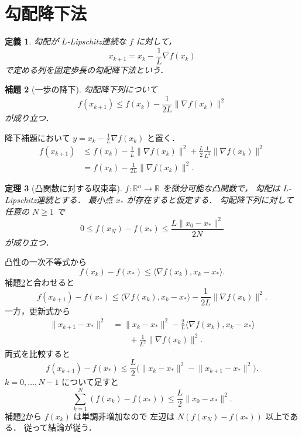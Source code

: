 \documentclass[a5paper,10pt,onecolumn]{jsarticle}
\makeatletter
\theoremstyle{mathnotetheorem}
\newtheorem{theorem}{定理}[section]
\newtheorem{definition}[theorem]{定義}
\newtheorem{lemma}[theorem]{補題}
\renewcommand{\proofname}{証明}
\renewenvironment{proof}[1][\proofname]{%
  \par\pushQED{\qed}\normalfont\topsep4\p@\@plus2\p@\relax
  \trivlist\item[\hskip\labelsep\bfseries #1]\ignorespaces
}{\popQED\endtrivlist\@endpefalse}
\newcommand{\norm}[1]{\lVert #1\rVert}
\makeatother
\begin{document}
\section{勾配降下法}

\begin{definition}
勾配が $L$-Lipschitz連続な $f$ に対して，
\[
 x_{k+1}=x_k-\frac1L\nabla f(x_k)
\]
で定める列を固定歩長の\emph{勾配降下法}という．
\end{definition}

\begin{lemma}[一歩の降下]\label{lem:one-step}
勾配降下列について
\[
 f(x_{k+1})\le f(x_k)
 -\frac1{2L}\norm{\nabla f(x_k)}^2
\]
が成り立つ．
\end{lemma}
\begin{proof}
降下補題において
$y=x_k-\frac1L\nabla f(x_k)$ と置く．
\begin{align*}
 f(x_{k+1})
 &\le f(x_k)
 -\frac1L\norm{\nabla f(x_k)}^2
 +\frac L2\frac1{L^2}\norm{\nabla f(x_k)}^2\\
 &=f(x_k)-\frac1{2L}\norm{\nabla f(x_k)}^2.
\end{align*}
\end{proof}

\begin{theorem}[凸関数に対する収束率]\label{thm:convex-rate}
$f:\mathbb R^n\to\mathbb R$ を微分可能な凸関数で，
勾配は $L$-Lipschitz連続とする．
最小点 $x_*$ が存在すると仮定する．
勾配降下列に対して任意の $N\ge1$ で
\[
 0\le f(x_N)-f(x_*)
 \le\frac{L\norm{x_0-x_*}^2}{2N}
\]
が成り立つ．
\end{theorem}
\begin{proof}
凸性の一次不等式から
\[
 f(x_k)-f(x_*)
 \le\langle\nabla f(x_k),x_k-x_*\rangle.
\]
補題\ref{lem:one-step}と合わせると
\[
 f(x_{k+1})-f(x_*)
 \le\langle\nabla f(x_k),x_k-x_*\rangle
 -\frac1{2L}\norm{\nabla f(x_k)}^2.
\]
一方，更新式から
\begin{align*}
 \norm{x_{k+1}-x_*}^2
 &=\norm{x_k-x_*}^2
 -\frac2L\langle\nabla f(x_k),x_k-x_*\rangle\\
 &\qquad+\frac1{L^2}\norm{\nabla f(x_k)}^2.
\end{align*}
両式を比較すると
\[
 f(x_{k+1})-f(x_*)
 \le\frac L2
 \bigl(\norm{x_k-x_*}^2-\norm{x_{k+1}-x_*}^2\bigr).
\]
$k=0,\dots,N-1$ について足すと
\[
 \sum_{k=1}^N(f(x_k)-f(x_*))
 \le\frac L2\norm{x_0-x_*}^2.
\]
補題\ref{lem:one-step}から $f(x_k)$ は単調非増加なので
左辺は $N(f(x_N)-f(x_*))$ 以上である．
従って結論が従う．
\end{proof}
\end{document}
